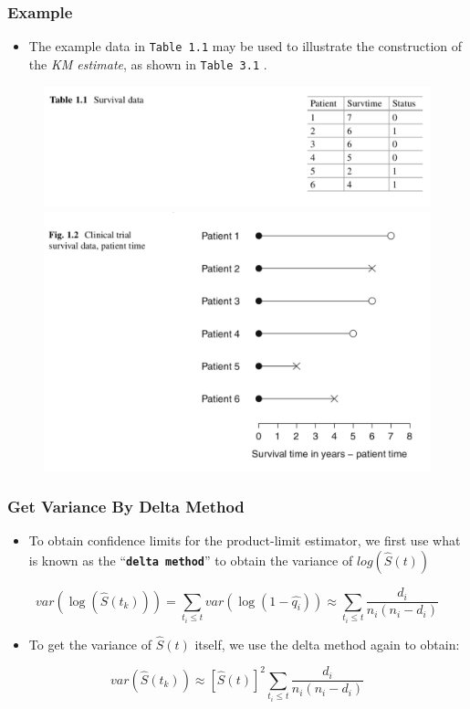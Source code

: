 \documentclass{beamer}
\newcommand{\empr}[1]{{\emph{\color{red}#1}}}
\newcommand{\pkg}[1]{{\textbf{\texttt{#1}}}}
\begin{document}
\pagebreak
\begin{frame}
\frametitle{Example}
\begin{itemize}
\item The example data in \texttt{Table 1.1} may be used to illustrate the construction of the \empr{KM estimate}, as shown in \texttt{Table 3.1} .	
\end{itemize}
\begin{figure}[t]
	\includegraphics[scale = .3]{001.png}
	\includegraphics[scale = .3]{002.png}
\end{figure}
\end{frame}

\pagebreak
\begin{frame}
\frametitle{Get Variance By Delta Method}
\begin{itemize}
\item To obtain confidence limits for the product-limit estimator, we first use what is known as the ``\pkg{delta method}''  to obtain the variance of $log(\hat{S}(t))$
\end{itemize}
\begin{equation}
var(\log(\hat{S}(t_k))) = \sum\limits_{t_i\le t}^{}var(\log(1-\hat{q_i}))\approx \sum\limits_{t_i\le t}^{} \frac{d_i}{n_i(n_i -d_i)}
\end{equation}

\begin{itemize}
\item To get the variance of $\hat{S}(t)$ itself, we use the delta method again to obtain:
\end{itemize}
\begin{equation}
var(\hat{S}(t_k))\approx [\hat{S}(t)]^{2} \sum\limits_{t_i\le t}^{} \frac{d_i}{n_i(n_i -d_i)}
\end{equation}
\end{frame}
\end{document}
